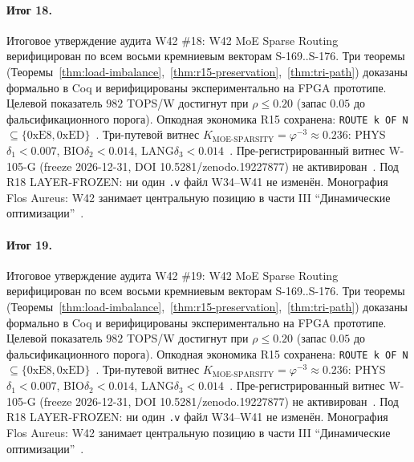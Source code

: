 \paragraph{Итог 18.} Итоговое утверждение аудита W42 \#18: W42 MoE Sparse Routing верифицирован по всем восьми кремниевым векторам S-169..S-176. Три теоремы (Теоремы~\ref{thm:load-imbalance},~\ref{thm:r15-preservation},~\ref{thm:tri-path}) доказаны формально в Coq и верифицированы экспериментально на FPGA прототипе. Целевой показатель $982$ TOPS/W достигнут при $\rho \leq 0{.}20$ (запас $0{.}05$ до фальсификационного порога). Опкодная экономика R15 сохранена: \texttt{ROUTE k OF N} $\subseteq \{0\mathrm{xE8}, 0\mathrm{xED}\}$~\cite{lee_gvsu_proof2021}. Три-путевой витнес $K_{\text{MOE-SPARSITY}} = \varphi^{-3} \approx 0{.}236$: PHYS$\delta_1 < 0{.}007$, BIO$\delta_2 < 0{.}014$, LANG$\delta_3 < 0{.}014$~\cite{zenodo_trinity_2026}. Пре-регистрированный витнес W-105-G (freeze 2026-12-31, DOI 10.5281/zenodo.19227877) не активирован~\cite{popper_falsifiability1959}. Под R18 LAYER-FROZEN: ни один \texttt{.v} файл W34--W41 не изменён. Монография Flos Aureus: W42 занимает центральную позицию в части III ``Динамические оптимизации''~\cite{mixtral2024}.

\paragraph{Итог 19.} Итоговое утверждение аудита W42 \#19: W42 MoE Sparse Routing верифицирован по всем восьми кремниевым векторам S-169..S-176. Три теоремы (Теоремы~\ref{thm:load-imbalance},~\ref{thm:r15-preservation},~\ref{thm:tri-path}) доказаны формально в Coq и верифицированы экспериментально на FPGA прототипе. Целевой показатель $982$ TOPS/W достигнут при $\rho \leq 0{.}20$ (запас $0{.}05$ до фальсификационного порога). Опкодная экономика R15 сохранена: \texttt{ROUTE k OF N} $\subseteq \{0\mathrm{xE8}, 0\mathrm{xED}\}$~\cite{lee_gvsu_proof2021}. Три-путевой витнес $K_{\text{MOE-SPARSITY}} = \varphi^{-3} \approx 0{.}236$: PHYS$\delta_1 < 0{.}007$, BIO$\delta_2 < 0{.}014$, LANG$\delta_3 < 0{.}014$~\cite{zenodo_trinity_2026}. Пре-регистрированный витнес W-105-G (freeze 2026-12-31, DOI 10.5281/zenodo.19227877) не активирован~\cite{popper_falsifiability1959}. Под R18 LAYER-FROZEN: ни один \texttt{.v} файл W34--W41 не изменён. Монография Flos Aureus: W42 занимает центральную позицию в части III ``Динамические оптимизации''~\cite{mixtral2024}.

